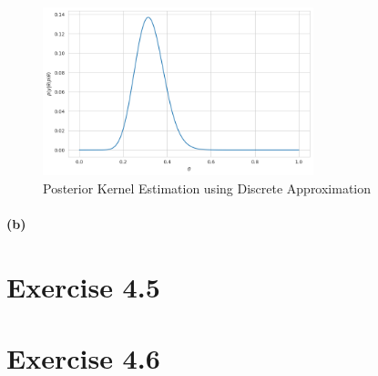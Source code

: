\documentclass[11pt, letterpaper]{article}
\begin{document}
\begin{figure}[!h]
  \centering
  \includegraphics[width=0.7\textwidth]{4.4.a.png}
  \captionsetup{justification=centering}
  \caption{Posterior Kernel Estimation using Discrete Approximation}
\end{figure}
\newpage

\paragraph{(b)}




\section{Exercise 4.5}
\section{Exercise 4.6}
\end{document}
